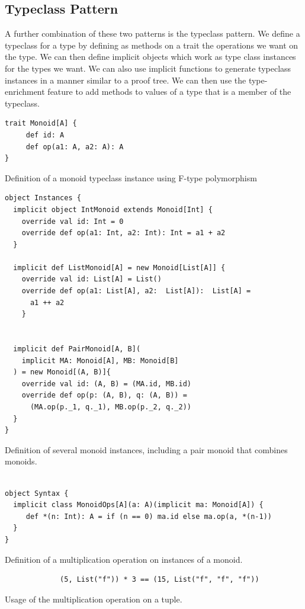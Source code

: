 \documentclass[12pt,a4paper,twoside,openright]{report}
\renewcommand{\baselinestretch}{1.1}    %
\begin{document}
\subsection{Typeclass Pattern}
A further combination of these two patterns is the typeclass pattern. We define a typeclass for a type by defining as methods on a trait the operations we want on the type. We can then define implicit objects which work as type class instances for the types we want. We can also use implicit functions to generate typeclass instances in a manner similar to a proof tree. We can then use the type-enrichment feature to add methods to values of a type that is a member of the typeclass.

\renewcommand{\baselinestretch}{0.8}
\begin{framed}
	\begin{framed}
		\begin{verbatim}
trait Monoid[A] {
     def id: A
     def op(a1: A, a2: A): A
}
		\end{verbatim}
	\end{framed}
	
	Definition of a monoid typeclass instance using F-type polymorphism
	
	\begin{framed}
		\begin{verbatim}
object Instances {
  implicit object IntMonoid extends Monoid[Int] {
    override val id: Int = 0
    override def op(a1: Int, a2: Int): Int = a1 + a2
  }

  implicit def ListMonoid[A] = new Monoid[List[A]] {
    override val id: List[A] = List()
    override def op(a1: List[A], a2:  List[A]):  List[A] =
      a1 ++ a2
    }
 

  implicit def PairMonoid[A, B](
    implicit MA: Monoid[A], MB: Monoid[B]
  ) = new Monoid[(A, B)]{
    override val id: (A, B) = (MA.id, MB.id)
    override def op(p: (A, B), q: (A, B)) =
      (MA.op(p._1, q._1), MB.op(p._2, q._2))
  }
}
	\end{verbatim}
	\end{framed}
	
	Definition of several monoid instances, including a pair monoid that combines monoids.
	
	\begin{framed}
		\begin{verbatim}
		
object Syntax {
  implicit class MonoidOps[A](a: A)(implicit ma: Monoid[A]) {
     def *(n: Int): A = if (n == 0) ma.id else ma.op(a, *(n-1))
  }
}
		\end{verbatim}
	\end{framed}
Definition of a multiplication operation on instances of a monoid.
	\begin{framed}
		\begin{verbatim}
			 (5, List("f")) * 3 == (15, List("f", "f", "f"))
		\end{verbatim}
	\end{framed}
Usage of the multiplication operation on a tuple.
\end{framed}
\renewcommand{\baselinestretch}{0.8}
\end{document}
